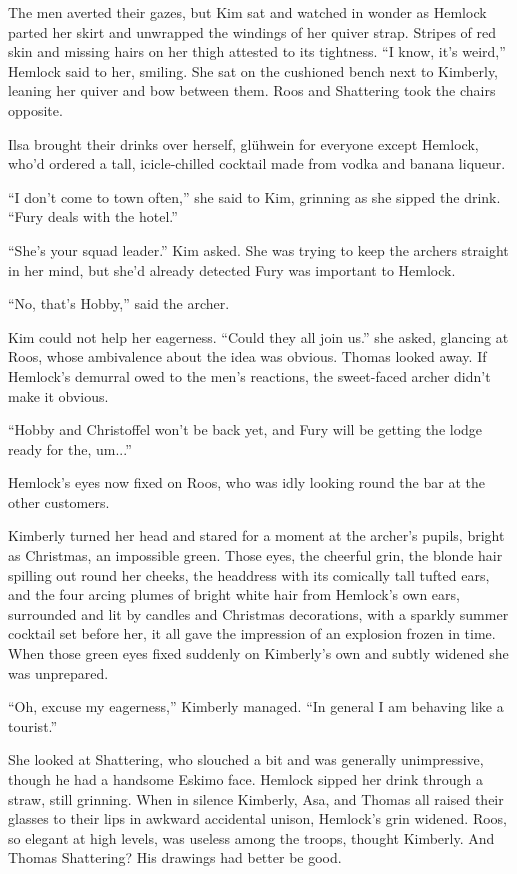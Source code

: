 \documentclass[11pt,a5paper]{article}
\begin{document}
The men averted their gazes, but Kim sat and watched in wonder as Hemlock parted her skirt and unwrapped the windings of her quiver strap. Stripes of red skin and missing hairs on her thigh attested to its tightness. ``I know, it's weird,'' Hemlock said to her, smiling. She sat on the cushioned bench next to Kimberly, leaning her quiver and bow between them. Roos and Shattering took the chairs opposite.

Ilsa brought their drinks over herself, glühwein for everyone except Hemlock, who'd ordered a tall, icicle-chilled cocktail made from vodka and banana liqueur.

``I don't come to town often,'' she said to Kim, grinning as she sipped the drink. ``Fury deals with the hotel.''

``She's your squad leader.'' Kim asked. She was trying to keep the archers straight in her mind, but she'd already detected Fury was important to Hemlock.

``No, that's Hobby,'' said the archer.

Kim could not help her eagerness. ``Could they all join us.'' she asked, glancing at Roos, whose ambivalence about the idea was obvious. Thomas looked away. If Hemlock's demurral owed to the men's reactions, the sweet-faced archer didn't make it obvious.

``Hobby and Christoffel won't be back yet, and Fury will be getting the lodge ready for the, um...''

Hemlock's eyes now fixed on Roos, who was idly looking round the bar at the other customers.

Kimberly turned her head and stared for a moment at the archer's pupils, bright as Christmas, an impossible green. Those eyes, the cheerful grin, the blonde hair spilling out round her cheeks, the headdress with its comically tall tufted ears, and the four arcing plumes of bright white hair from Hemlock's own ears, surrounded and lit by candles and Christmas decorations, with a sparkly summer cocktail set before her, it all gave the impression of an explosion frozen in time. When those green eyes fixed suddenly on Kimberly's own and subtly widened she was unprepared.

``Oh, excuse my eagerness,'' Kimberly managed. ``In general I am behaving like a tourist.''

She looked at Shattering, who slouched a bit and was generally unimpressive, though he had a handsome Eskimo face. Hemlock sipped her drink through a straw, still grinning. When in silence Kimberly, Asa, and Thomas all raised their glasses to their lips in awkward accidental unison, Hemlock's grin widened. Roos, so elegant at high levels, was useless among the troops, thought Kimberly. And Thomas Shattering? His drawings had better be good.
\end{document}
